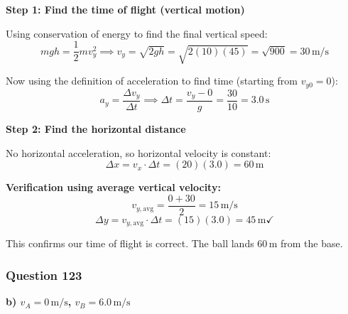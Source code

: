 \documentclass[12pt,letterpaper]{article}
\begin{document}
\begin{explanationbox}
\textbf{Step 1: Find the time of flight (vertical motion)}

Using conservation of energy to find the final vertical speed:
\[
mgh = \frac{1}{2}mv_y^2 \implies v_y = \sqrt{2gh} = \sqrt{2(10)(45)} = \sqrt{900} = 30\,\text{m/s}
\]

Now using the definition of acceleration to find time (starting from $v_{y0} = 0$):
\[
a_y = \frac{\Delta v_y}{\Delta t} \implies \Delta t = \frac{v_y - 0}{g} = \frac{30}{10} = 3.0\,\text{s}
\]

\textbf{Step 2: Find the horizontal distance}

No horizontal acceleration, so horizontal velocity is constant:
\[
\Delta x = v_x \cdot \Delta t = (20)(3.0) = 60\,\text{m}
\]

\textbf{Verification using average vertical velocity:}
\[
v_{y,\text{avg}} = \frac{0 + 30}{2} = 15\,\text{m/s}
\]
\[
\Delta y = v_{y,\text{avg}} \cdot \Delta t = (15)(3.0) = 45\,\text{m} \checkmark
\]

This confirms our time of flight is correct. The ball lands $60\,\text{m}$ from the base.
\end{explanationbox}

\subsubsection*{Question 123}

\begin{answerbox}
\textbf{b) $v_A = 0\,\text{m/s}$, $v_B = 6.0\,\text{m/s}$}
\end{answerbox}
\end{document}
